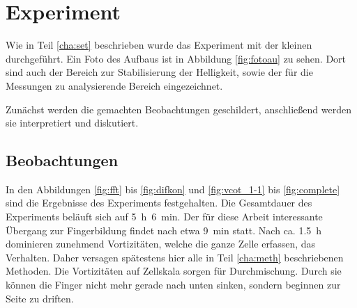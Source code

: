 % 



\section{\COTm Experiment}
\label{res:cot}


Wie in Teil \ref{cha:set} beschrieben wurde das \COTm Experiment mit der kleinen \HSC durchgeführt. Ein Foto des Aufbaus ist in Abbildung \ref{fig:fotoau} zu sehen. Dort sind auch der Bereich zur Stabilisierung der Helligkeit, sowie der für die Messungen zu analysierende Bereich eingezeichnet.

Zunächst werden die gemachten Beobachtungen geschildert, anschließend werden sie interpretiert und diskutiert.


\subsection{Beobachtungen}
\label{res:cot:beob}



In den Abbildungen \ref{fig:fft} bis \ref{fig:difkon} und \ref{fig:vcot_1-1} bis \ref{fig:complete} sind die Ergebnisse des \COTm Experiments festgehalten. Die Gesamtdauer des Experiments beläuft sich auf \mbox{\SI{5}{\hour} \SI{6}{\minute}}. Der für diese Arbeit interessante Übergang zur Fingerbildung findet nach etwa \SI{9}{\minute} statt. Nach ca. \SI{1,5}{\hour} dominieren zunehmend Vortizitäten, welche die ganze Zelle erfassen, das Verhalten. Daher versagen spätestens hier alle in Teil \ref{cha:meth} beschriebenen Methoden. 
Die Vortizitäten auf Zell\-skala sorgen für Durchmischung. Durch sie können die Finger nicht mehr gerade nach unten sinken, sondern beginnen zur Seite zu driften.

